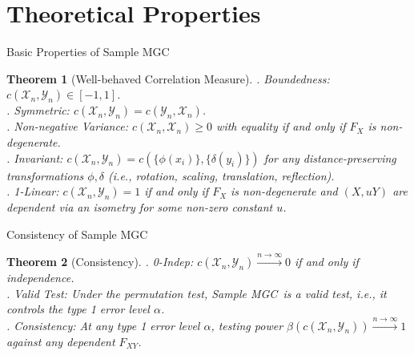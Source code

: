 \documentclass[mathserif,t]{beamer}
\newtheorem{thm}{Theorem}
\newcommand{\Mgc}{MGC}
\newcommand{\mbx}{X}
\newcommand{\mby}{Y}
\begin{document}





\section{Theoretical Properties}
\begin{frame}{Basic Properties of Sample \Mgc}
\begin{thm}[Well-behaved Correlation Measure]
. Boundedness: $c(\mathcal{X}_{n},\mathcal{Y}_{n}) \in [-1,1]$.\\
\pause
{}. Symmetric: $c(\mathcal{X}_{n},\mathcal{Y}_{n}) =c(\mathcal{Y}_{n},\mathcal{X}_{n})$.\\
\pause
{}. Non-negative Variance: $c(\mathcal{X}_{n},\mathcal{X}_{n}) \geq 0$ with equality if and only if $F_{X}$ is non-degenerate.\\
\pause
{}. Invariant: $c(\mathcal{X}_{n},\mathcal{Y}_{n})=c(\{\phi(x_{i})\},\{\delta(y_{i})\})$ for any distance-preserving transformations $\phi,\delta$ (i.e., rotation, scaling, translation, reflection).\\
\pause
{}. 1-Linear: $c(\mathcal{X}_{n},\mathcal{Y}_{n})=1$ if and only if $F_{X}$ is non-degenerate and $(X, u Y)$ are dependent via an isometry for some non-zero constant $u$.\\
\end{thm}
\end{frame}

\begin{frame}{Consistency of Sample \Mgc}
\begin{thm}[Consistency]
. 0-Indep: $c(\mathcal{X}_{n},\mathcal{Y}_{n}) \stackrel{n \rightarrow \infty}{\rightarrow}0$ if and only if independence.\\
\pause
{}. Valid Test: Under the permutation test, Sample \Mgc~is a valid test, i.e., it controls the type 1 error level $\alpha$.\\
\pause
{}. Consistency: At any type 1 error level $\alpha$, testing power $\beta(c(\mathcal{X}_{n},\mathcal{Y}_{n})) \stackrel{n \rightarrow \infty}{\rightarrow} 1$ against any dependent $F_{\mbx \mby}$.\\
\end{thm}
\end{frame}
\end{document}
